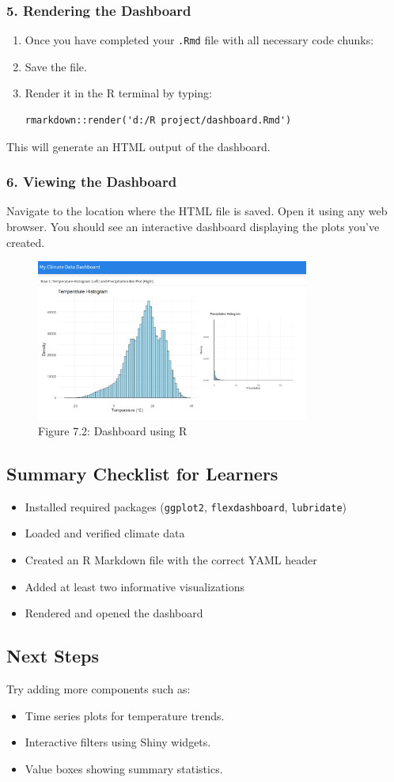 \subsubsection*{5. Rendering the Dashboard}
\begin{enumerate}
\item Once you have completed your \texttt{.Rmd} file with all necessary code chunks:
\item Save the file.
\item Render it in the R terminal by typing:
\begin{verbatim}
rmarkdown::render('d:/R project/dashboard.Rmd')
\end{verbatim}
\end{enumerate}

This will generate an HTML output of the dashboard.

\subsubsection*{6. Viewing the Dashboard}
Navigate to the location where the HTML file is saved. Open it using any web browser. You should see an interactive dashboard displaying the plots you’ve created.

\begin{figure}[h]
\centering
\includegraphics[width=0.8\textwidth]{figures/dashboard.png}
\caption{Figure 7.2: Dashboard using R}
\end{figure}

\subsection*{Summary Checklist for Learners}
\begin{itemize}
\item Installed required packages (\texttt{ggplot2}, \texttt{flexdashboard}, \texttt{lubridate})
\item Loaded and verified climate data
\item Created an R Markdown file with the correct YAML header
\item Added at least two informative visualizations
\item Rendered and opened the dashboard
\end{itemize}

\subsection*{Next Steps}
Try adding more components such as:
\begin{itemize}
\item Time series plots for temperature trends.
\item Interactive filters using Shiny widgets.
\item Value boxes showing summary statistics.
\end{itemize}
